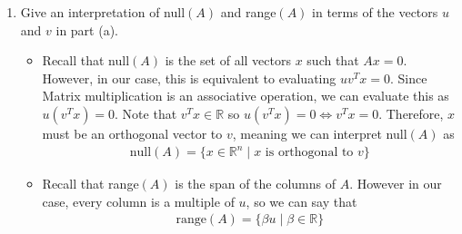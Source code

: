 \documentclass[10pt,a4paper]{article}
\theoremstyle{definition}
\theoremstyle{definition}
\numberwithin{equation}{section}
\begin{document}
\begin{enumerate}[label = (\alph*)]
\begin{itemize}
\begin{proof}
\begin{align*}
\begin{bmatrix}
	\end{bmatrix} \cdot \begin{bmatrix}
	\beta_1 & \beta_2 & \cdots & \beta_n
	\end{bmatrix}\\
	&= \begin{bmatrix}
	u_1 \beta_1 & u_1 \beta_2 & \cdots & u_1 \beta_n\\
	u_2 \beta_1 & u_2 \beta_2 & \cdots & u_2 \beta_n\\
	\vdots & \vdots & \ddots & \vdots\\
	u_n \beta_1 & u_n \beta_2 & \cdots & u_n \beta_n\\ 
	\end{bmatrix}\\
	&= \begin{bmatrix}
	\vline & \vline & & \vline\\
	\beta_1 a_1 & \beta_2 a_1 & \ldots & \beta_n a_1\\
	\vline & \vline & & \vline
	\end{bmatrix}\\
	&= A
	\end{align*}
	Notice that $a_1$ is nonzero and that not every $\beta_i$ is zero or otherwise $A$ would be the zero matrix which has Rank of zero. Thus, $u, v \neq 0$ and we have shown the desired statement. 
	\end{proof}
	\end{itemize}
\item Give an interpretation of null$(A)$ and range$(A)$ in terms of the vectors $u$ and $v$ in part (a).
	\begin{itemize}
	\item Recall that null$(A)$ is the set of all vectors $x$ such that $Ax = 0$. However, in our case, this is equivalent to evaluating $uv^Tx = 0$. Since Matrix multiplication is an associative operation, we can evaluate this as $u(v^T x) = 0$. Note that $v^T x \in \mathbb{R}$ so $u(v^T x) = 0 \iff v^T x = 0$. Therefore, $x$ must be an orthogonal vector to $v$, meaning we can interpret null$(A)$ as
	\begin{align*}
	\text{null}(A) = \{x \in \mathbb{R}^n \; | \; x \text{ is orthogonal to } v\}
	\end{align*}
	\item Recall that range$(A)$ is the span of the columns of $A$. However in our case, every column is a multiple of $u$, so we can say that 
	\begin{align*}
	\text{range}(A) = \{\beta u \; | \; \beta \in \mathbb{R}\}
	\end{align*}
	\end{itemize}	 
\end{enumerate}
\end{document}
